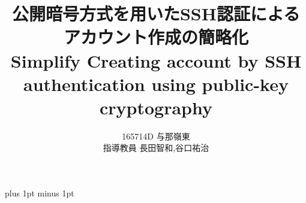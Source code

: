 \documentclass[a4j,12pt]{jreport}
\title{
公開暗号方式を用いたSSH認証によるアカウント作成の簡略化\\
Simplify Creating account by %
SSH authentication using public-key cryptography
}
\author{165714D 与那嶺東  \\ 指導教員 {長田智和,谷口祐治} }
\begin{document}
\maketitle
\baselineskip 17pt plus 1pt minus 1pt

\setcounter{page}{0}

\tableofcontents	%
\listoffigures		%
\listoftables		%










%







%
\end{document}
